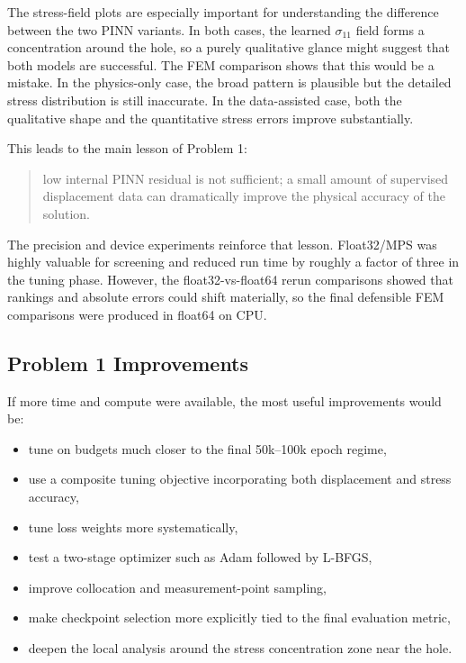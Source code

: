 \documentclass[11pt]{article}
\begin{document}
The stress-field plots are especially important for understanding the difference between the two PINN variants. In both cases, the learned \(\sigma_{11}\) field forms a concentration around the hole, so a purely qualitative glance might suggest that both models are successful. The FEM comparison shows that this would be a mistake. In the physics-only case, the broad pattern is plausible but the detailed stress distribution is still inaccurate. In the data-assisted case, both the qualitative shape and the quantitative stress errors improve substantially.

This leads to the main lesson of Problem 1:
\begin{quote}
low internal PINN residual is not sufficient; a small amount of supervised displacement data can dramatically improve the physical accuracy of the solution.
\end{quote}

The precision and device experiments reinforce that lesson. Float32/MPS was highly valuable for screening and reduced run time by roughly a factor of three in the tuning phase. However, the float32-vs-float64 rerun comparisons showed that rankings and absolute errors could shift materially, so the final defensible FEM comparisons were produced in float64 on CPU.

\subsection*{Problem 1 Improvements}

If more time and compute were available, the most useful improvements would be:
\begin{itemize}[itemsep=0.25em]
    \item tune on budgets much closer to the final 50k--100k epoch regime,
    \item use a composite tuning objective incorporating both displacement and stress accuracy,
    \item tune loss weights more systematically,
    \item test a two-stage optimizer such as Adam followed by L-BFGS,
    \item improve collocation and measurement-point sampling,
    \item make checkpoint selection more explicitly tied to the final evaluation metric,
    \item deepen the local analysis around the stress concentration zone near the hole.
\end{itemize}
\end{document}

